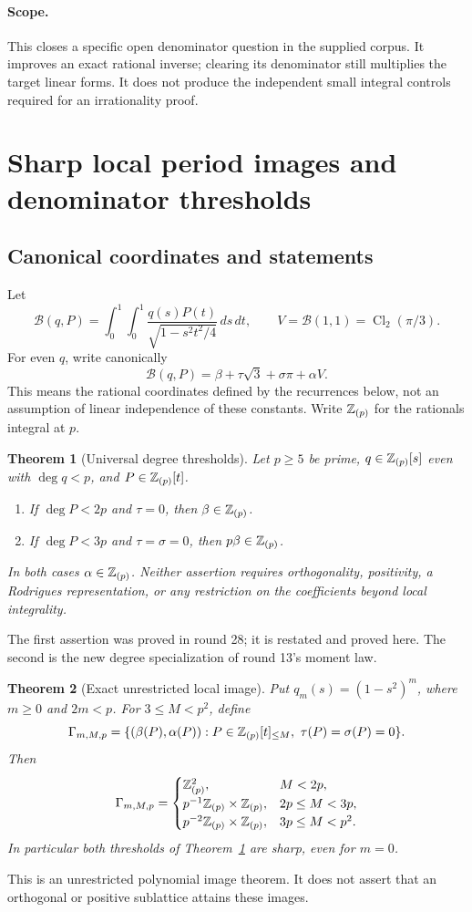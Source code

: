 \documentclass[11pt,a4paper]{article}
\numberwithin{equation}{section}
\newtheorem{theorem}{Theorem}[section]
\theoremstyle{definition}\newtheorem{definition}[theorem]{Definition}
\theoremstyle{remark}\newtheorem{remark}[theorem]{Remark}
\newcommand{\B}{\mathcal B}\newcommand{\N}{\mathcal N}\newcommand{\M}{\mathcal M}
\begin{document}
\paragraph{Scope.}
This closes a specific open denominator question in the supplied corpus.
It improves an exact rational inverse; clearing its denominator still
multiplies the target linear forms. It does not produce the independent
small integral controls required for an irrationality proof.



\section{Sharp local period images and denominator thresholds}
\subsection{Canonical coordinates and statements}
Let
\[
 \B(q,P)=\int_0^1\!\int_0^1\frac{q(s)P(t)}{\sqrt{1-s^2t^2/4}}\,ds\,dt,
 \qquad V=\B(1,1)=\operatorname{Cl}_2(\pi/3).
\]
For even $q$, write canonically
\[
 \B(q,P)=\beta+\tau\sqrt3+\sigma\pi+\alpha V.
\]
This means the rational coordinates defined by the recurrences below, not an assumption of linear independence of these constants. Write $\mathbb Z_{(p)}$ for the rationals integral at $p$.

\begin{theorem}[Universal degree thresholds]\label{local:universal}
Let $p\ge5$ be prime, $q\in\mathbb Z_{(p)}[s]$ even with $\deg q<p$, and $P\in\mathbb Z_{(p)}[t]$.
\begin{enumerate}
\item If $\deg P<2p$ and $\tau=0$, then $\beta\in\mathbb Z_{(p)}$.
\item If $\deg P<3p$ and $\tau=\sigma=0$, then $p\beta\in\mathbb Z_{(p)}$.
\end{enumerate}
In both cases $\alpha\in\mathbb Z_{(p)}$. Neither assertion requires orthogonality, positivity, a Rodrigues representation, or any restriction on the coefficients beyond local integrality.
\end{theorem}
The first assertion was proved in round 28; it is restated and proved here. The second is the new degree specialization of round 13's moment law.

\begin{theorem}[Exact unrestricted local image]\label{local:phase}
Put $q_m(s)=(1-s^2)^m$, where $m\ge0$ and $2m<p$. For $3\le M<p^2$, define
\[
 \Gamma_{m,M,p}=\{(\beta(P),\alpha(P)):P\in\mathbb Z_{(p)}[t]_{\le M},\ \tau(P)=\sigma(P)=0\}.
\]
Then
\[
 \Gamma_{m,M,p}=\begin{cases}
 \mathbb Z_{(p)}^2,&M<2p,\\
 p^{-1}\mathbb Z_{(p)}\times\mathbb Z_{(p)},&2p\le M<3p,\\
 p^{-2}\mathbb Z_{(p)}\times\mathbb Z_{(p)},&3p\le M<p^2.
 \end{cases}
\]
In particular both thresholds of Theorem~\ref{local:universal} are sharp, even for $m=0$.
\end{theorem}
This is an unrestricted polynomial image theorem. It does not assert that an orthogonal or positive sublattice attains these images.
\end{document}
